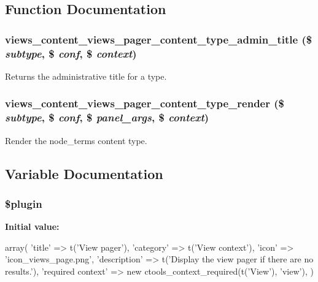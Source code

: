 \subsection{Function Documentation}
\hypertarget{views__pager_8inc_ab5b6c59c4a656235cd81fc7a3956ec23}{
\subsubsection[{views\_\-content\_\-views\_\-pager\_\-content\_\-type\_\-admin\_\-title}]{\setlength{\rightskip}{0pt plus 5cm}views\_\-content\_\-views\_\-pager\_\-content\_\-type\_\-admin\_\-title (\$ {\em subtype}, \/  \$ {\em conf}, \/  \$ {\em context})}}
\label{views__pager_8inc_ab5b6c59c4a656235cd81fc7a3956ec23}
Returns the administrative title for a type. \hypertarget{views__pager_8inc_aa5e204ac9f668ab35572cdb1b0b4a699}{
\subsubsection[{views\_\-content\_\-views\_\-pager\_\-content\_\-type\_\-render}]{\setlength{\rightskip}{0pt plus 5cm}views\_\-content\_\-views\_\-pager\_\-content\_\-type\_\-render (\$ {\em subtype}, \/  \$ {\em conf}, \/  \$ {\em panel\_\-args}, \/  \$ {\em context})}}
\label{views__pager_8inc_aa5e204ac9f668ab35572cdb1b0b4a699}
Render the node\_\-terms content type. 

\subsection{Variable Documentation}
\hypertarget{views__pager_8inc_ada8a7130088351710bb02ed622d6bf65}{
\subsubsection[{\$plugin}]{\setlength{\rightskip}{0pt plus 5cm}\$plugin}}
\label{views__pager_8inc_ada8a7130088351710bb02ed622d6bf65}
{\bfseries Initial value:}
\begin{DoxyCode}
 array(
  'title' => t('View pager'),
  'category' => t('View context'),
  'icon' => 'icon_views_page.png',
  'description' => t('Display the view pager if there are no results.'),
  'required context' => new ctools_context_required(t('View'), 'view'),
)
\end{DoxyCode}
